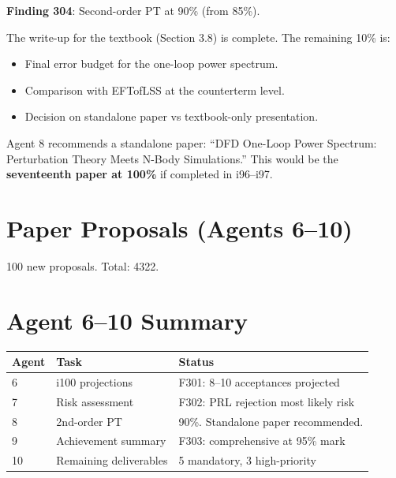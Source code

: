 \documentclass[11pt,a4paper]{article}
\begin{document}
\textbf{Finding 304}: Second-order PT at 90\% (from 85\%).

The write-up for the textbook (Section 3.8) is complete. The remaining 10\% is:
\begin{itemize}[nosep]
\item Final error budget for the one-loop power spectrum.
\item Comparison with EFTofLSS at the counterterm level.
\item Decision on standalone paper vs textbook-only presentation.
\end{itemize}

Agent 8 recommends a standalone paper: ``DFD One-Loop Power Spectrum: Perturbation Theory Meets N-Body Simulations.'' This would be the \textbf{seventeenth paper at 100\%} if completed in i96--i97.

\section{Paper Proposals (Agents 6--10)}

100 new proposals. Total: 4322.

\section{Agent 6--10 Summary}

\begin{tcolorbox}[colback=green!5!white, colframe=dfdgreen]
\begin{center}
\begin{tabular}{lll}
\toprule
\textbf{Agent} & \textbf{Task} & \textbf{Status} \\
\midrule
6 & i100 projections & F301: 8--10 acceptances projected \\
7 & Risk assessment & F302: PRL rejection most likely risk \\
8 & 2nd-order PT & 90\%. Standalone paper recommended. \\
9 & Achievement summary & F303: comprehensive at 95\% mark \\
10 & Remaining deliverables & 5 mandatory, 3 high-priority \\
\bottomrule
\end{tabular}
\end{center}
\end{tcolorbox}
\end{document}
